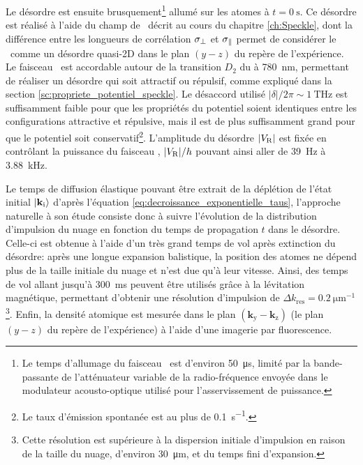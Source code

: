 Le désordre est ensuite brusquement\footnote{Le temps d'allumage du faisceau \speckle\ est d'environ \SI{50}{\micro\second}, limité par la bande-passante de l'atténuateur variable de la radio-fréquence envoyée dans le modulateur acousto-optique utilisé pour l'asservissement de puissance.} allumé sur les atomes à $t=\SI{0}{\second}$. Ce désordre est réalisé à l'aide du champ de \speckle\ décrit au cours du chapitre \ref{ch:Speckle}, dont la différence entre les longueurs de corrélation $\sigma_{\perp}$ et $\sigma_{\parallel}$ permet de considérer le \speckle\ comme un désordre quasi-2D dans le plan $(y-z)$ du repère de l'expérience. Le faisceau \speckle\ est accordable autour de la transition $D_2$ du  à \SI{780}{\nano\metre}, permettant de réaliser un désordre qui soit attractif ou répulsif, comme expliqué dans la section \ref{sc:propriete_potentiel_speckle}. Le désaccord utilisé $|\delta|/2\pi\sim\SI{1}{\tera\hertz}$ est suffisamment faible pour que les propriétés du potentiel soient identiques entre les configurations attractive et répulsive, mais il est de plus suffisamment grand pour que le potentiel soit conservatif\footnote{Le taux d'émission spontanée est au plus de \SI{0.1}{\second^{-1}}.}. L'amplitude du désordre $|V_{\mathrm{R}}|$ est fixée en contrôlant la puissance du faisceau \speckle , $|V_{\mathrm{R}}|/h$ pouvant ainsi aller de \SI{39}{\hertz} à \SI{3.88}{\kilo\hertz}. 

Le temps de diffusion élastique pouvant être extrait de la déplétion de l'état initial $\left| \mathbf{k}_{\mathrm{i}} \right\rangle$ d'après l'équation \ref{eq:decroissance_exponentielle_taus}, l'approche naturelle à son étude consiste donc à suivre l'évolution de la distribution d'impulsion du nuage en fonction du temps de propagation $t$ dans le désordre. Celle-ci est obtenue à l'aide d'un très grand temps de vol après extinction du désordre: après une longue expansion balistique, la position des atomes ne dépend plus de la taille initiale du nuage et n'est due qu'à leur vitesse. Ainsi, des temps de vol allant jusqu'à \SI{300}{\milli\second} peuvent être utilisés grâce à la lévitation magnétique, permettant d'obtenir une résolution d'impulsion de $\Delta k_{\mathrm{res}}=\SI{0.2}{\micro\metre^{-1}}$\footnote{Cette résolution est supérieure à la dispersion initiale d'impulsion en raison de la taille du nuage, d'environ \SI{30}{\micro\metre}, et du temps fini d'expansion.}. Enfin, la densité atomique est mesurée dans le plan $(\mathbf{k}_{\mathrm{y}}-\mathbf{k}_{\mathrm{z}})$ (le plan $(y-z)$ du repère de l'expérience) à l'aide d'une imagerie par fluorescence.

